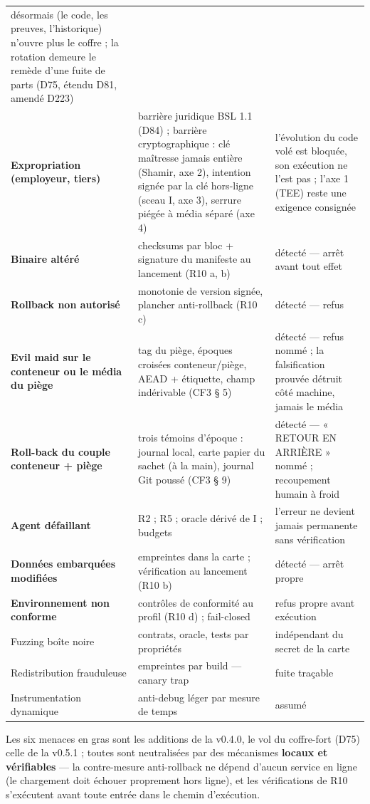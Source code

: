 \begin{table}[htbp]
\begin{tabularx}{\textwidth}{@{}Y Y Y@{}}
désormais (le code, les preuves, l'historique) n'ouvre plus le coffre ; la rotation
demeure le remède d'une fuite de parts (D75, étendu D81, amendé D223) \\
\textbf{Expropriation (employeur, tiers)} & barrière juridique BSL 1.1 (D84) ;
barrière cryptographique : clé maîtresse jamais entière (Shamir, axe 2), intention
signée par la clé hors-ligne (sceau I, axe 3), serrure piégée à média séparé (axe 4) &
l'évolution du code volé est bloquée, son exécution ne l'est pas ; l'axe 1 (TEE) reste une
exigence consignée \\
\textbf{Binaire altéré} & checksums par bloc + signature du manifeste au lancement
(R10 a, b) & détecté — arrêt avant tout effet \\
\textbf{Rollback non autorisé} & monotonie de version signée, plancher anti-rollback
(R10 c) & détecté — refus \\
\textbf{Evil maid sur le conteneur ou le média du piège} & tag du piège, époques
croisées conteneur/piège, AEAD + étiquette, champ  indérivable (CF3
§ 5) & détecté — refus nommé ; la falsification prouvée détruit côté machine,
jamais le média \\
\textbf{Roll-back du couple conteneur + piège} & trois témoins d'époque : journal
local, carte papier du sachet (à la main), journal Git poussé (CF3 § 9) & détecté —
« RETOUR EN ARRIÈRE » nommé ; recoupement humain à froid \\
\textbf{Agent défaillant} & R2 ; R5 ; oracle dérivé de I ; budgets & l'erreur ne devient
jamais permanente sans vérification \\
\textbf{Données embarquées modifiées} & empreintes dans la carte ; vérification au
lancement (R10 b) & détecté — arrêt propre \\
\textbf{Environnement non conforme} & contrôles de conformité au profil (R10 d) ;
fail-closed & refus propre avant exécution \\
Fuzzing boîte noire & contrats, oracle, tests par propriétés & indépendant du secret de
la carte \\
Redistribution frauduleuse & empreintes par build — canary trap & fuite traçable \\
Instrumentation dynamique & anti-debug léger par mesure de temps & assumé \\
\bottomrule
\end{tabularx}
\end{table}

Les six menaces en gras sont les additions de la v0.4.0, le vol du coffre-fort (D75)
celle de la v0.5.1 ; toutes sont neutralisées par des mécanismes \textbf{locaux et
vérifiables} — la contre-mesure anti-rollback ne dépend d'aucun service en ligne (le
chargement doit échouer proprement hors ligne), et les vérifications de R10 s'exécutent
avant toute entrée dans le chemin d'exécution.

